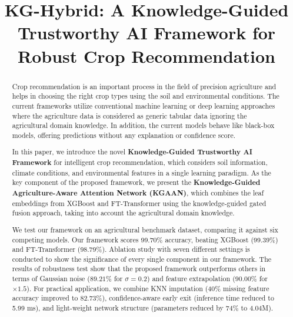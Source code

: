 \documentclass[journal]{IEEEtran}
\begin{document}
\title{KG-Hybrid: A Knowledge-Guided Trustworthy AI Framework for Robust Crop Recommendation}

\author{
}

\maketitle

\begin{abstract}

Crop recommendation is an important process in the field of precision agriculture and helps in choosing the right crop types using the soil and environmental conditions. The current frameworks utilize conventional machine learning or deep learning approaches where the agriculture data is considered as generic tabular data ignoring the agricultural domain knowledge. In addition, the current models behave like black-box models, offering predictions without any explanation or confidence score.

In this paper, we introduce the novel \textbf{Knowledge-Guided Trustworthy AI Framework} for intelligent crop recommendation, which considers soil information, climate conditions, and environmental features in a single learning paradigm. As the key component of the proposed framework, we present the \textbf{Knowledge-Guided Agriculture-Aware Attention Network (KGAAN)}, which combines the leaf embeddings from XGBoost and FT-Transformer using the knowledge-guided gated fusion approach, taking into account the agricultural domain knowledge.

We test our framework on an agricultural benchmark dataset, comparing it against six competing models. Our framework scores 99.70\% accuracy, beating XGBoost (99.39\%) and FT-Transformer (98.79\%). Ablation study with seven different settings is conducted to show the significance of every single component in our framework. The results of robustness test show that the proposed framework outperforms others in terms of Gaussian noise ($89.21\%$ for $\sigma=0.2$) and feature extrapolation ($90.00\%$ for $\times 1.5$). For practical application, we combine KNN imputation (40\% missing feature accuracy improved to 82.73\%), confidence-aware early exit (inference time reduced to 5.99 ms), and light-weight network structure (parameters reduced by 74\% to 4.04M).

\end{abstract}
\end{document}
